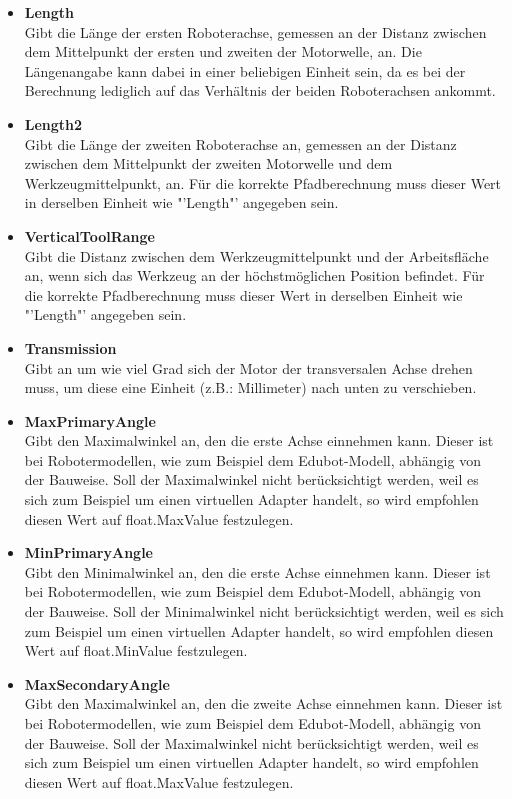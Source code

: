 \begin{itemize}
\item \textbf{Length}\\
Gibt die Länge der ersten Roboterachse, gemessen an der Distanz zwischen dem Mittelpunkt der ersten und zweiten der Motorwelle, an. Die Längenangabe kann dabei in einer beliebigen Einheit sein, da es bei der Berechnung lediglich auf das Verhältnis der beiden Roboterachsen ankommt.
\item \textbf{Length2}\\
Gibt die Länge der zweiten Roboterachse an, gemessen an der Distanz zwischen dem Mittelpunkt der zweiten Motorwelle und dem Werkzeugmittelpunkt, an. Für die korrekte Pfadberechnung muss dieser Wert in derselben Einheit wie "'Length"' angegeben sein.
\item \textbf{VerticalToolRange}\\
Gibt die Distanz zwischen dem Werkzeugmittelpunkt und der Arbeitsfläche an, wenn sich das Werkzeug an der höchstmöglichen Position befindet. Für die korrekte Pfadberechnung muss dieser Wert in derselben Einheit wie "'Length"' angegeben sein.
\item \textbf{Transmission}\\
Gibt an um wie viel Grad sich der Motor der transversalen Achse drehen muss, um diese eine Einheit (z.B.: Millimeter) nach unten zu verschieben.
\item \textbf{MaxPrimaryAngle}\\
Gibt den Maximalwinkel an, den die erste Achse einnehmen kann. Dieser ist bei Robotermodellen, wie zum Beispiel dem Edubot-Modell, abhängig von der Bauweise. Soll der Maximalwinkel nicht berücksichtigt werden, weil es sich zum Beispiel um einen virtuellen Adapter handelt, so wird empfohlen diesen Wert auf float.MaxValue festzulegen.
\item \textbf{MinPrimaryAngle}\\
Gibt den Minimalwinkel an, den die erste Achse einnehmen kann. Dieser ist bei Robotermodellen, wie zum Beispiel dem Edubot-Modell, abhängig von der Bauweise. Soll der Minimalwinkel nicht berücksichtigt werden, weil es sich zum Beispiel um einen virtuellen Adapter handelt, so wird empfohlen diesen Wert auf float.MinValue festzulegen.
\item \textbf{MaxSecondaryAngle}\\
Gibt den Maximalwinkel an, den die zweite Achse einnehmen kann. Dieser ist bei Robotermodellen, wie zum Beispiel dem Edubot-Modell, abhängig von der Bauweise. Soll der Maximalwinkel nicht berücksichtigt werden, weil es sich zum Beispiel um einen virtuellen Adapter handelt, so wird empfohlen diesen Wert auf float.MaxValue festzulegen.

\end{itemize}
